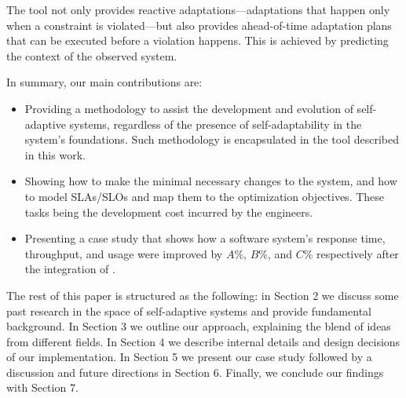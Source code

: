 The tool not only provides reactive adaptations---adaptations that happen only when a constraint is violated---but also provides ahead-of-time adaptation plans that can be executed before a violation happens. This is achieved by predicting the context of the observed system.

In summary, our main contributions are:

\begin{itemize}
  \item Providing a methodology to assist the development and evolution of self-adaptive systems, regardless of the presence of self-adaptability in the system's foundations. Such methodology is encapsulated in the tool described in this work.
  \item Showing how to make the minimal necessary changes to the system, and how to model SLAs/SLOs and map them to the optimization objectives. These tasks being the development cost incurred by the engineers.
  \item Presenting a case study that shows how a software system's response time, throughput, and usage were improved by $A\%$, $B\%$, and $C\%$ respectively after the integration of \projectname{}.
\end{itemize}

The rest of this paper is structured as the following: in Section 2 we discuss some past research in the space of self-adaptive systems and provide fundamental background. In Section 3 we outline our approach, explaining the blend of ideas from different fields. In Section 4 we describe internal details and design decisions of our implementation. In Section 5 we present our case study followed by a discussion and future directions in Section 6. Finally, we conclude our findings with Section 7.

%



